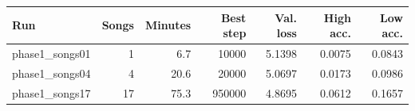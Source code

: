 \begin{tabular}{lrrrrrr}
\toprule
Run & Songs & Minutes & Best step & Val. loss & High acc. & Low acc. \\
\midrule
phase1\_songs01 & 1 & 6.7 & 10000 & 5.1398 & 0.0075 & 0.0843 \\
phase1\_songs04 & 4 & 20.6 & 20000 & 5.0697 & 0.0173 & 0.0986 \\
phase1\_songs17 & 17 & 75.3 & 950000 & 4.8695 & 0.0612 & 0.1657 \\
\bottomrule
\end{tabular}
